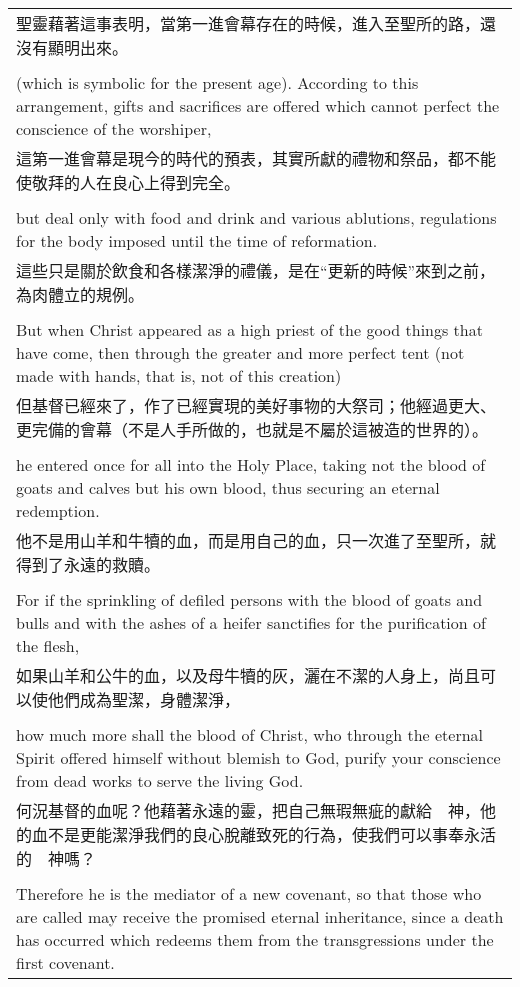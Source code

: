 \documentclass{book}
\begin{document}
\begin{tabularx}{\textwidth}{p{}}
聖靈藉著這事表明，當第一進會幕存在的時候，進入至聖所的路，還沒有顯明出來。 \\ \\
(which is symbolic for the present age). According to this arrangement, gifts and sacrifices are offered which cannot perfect the conscience of the worshiper, \\
這第一進會幕是現今的時代的預表，其實所獻的禮物和祭品，都不能使敬拜的人在良心上得到完全。 \\ \\
but deal only with food and drink and various ablutions, regulations for the body imposed until the time of reformation. \\
這些只是關於飲食和各樣潔淨的禮儀，是在“更新的時候”來到之前，為肉體立的規例。 \\ \\
But when Christ appeared as a high priest of the good things that have come, then through the greater and more perfect tent (not made with hands, that is, not of this creation) \\
但基督已經來了，作了已經實現的美好事物的大祭司；他經過更大、更完備的會幕（不是人手所做的，也就是不屬於這被造的世界的）。 \\ \\
he entered once for all into the Holy Place, taking not the blood of goats and calves but his own blood, thus securing an eternal redemption. \\
他不是用山羊和牛犢的血，而是用自己的血，只一次進了至聖所，就得到了永遠的救贖。 \\ \\
For if the sprinkling of defiled persons with the blood of goats and bulls and with the ashes of a heifer sanctifies for the purification of the flesh, \\
如果山羊和公牛的血，以及母牛犢的灰，灑在不潔的人身上，尚且可以使他們成為聖潔，身體潔淨， \\ \\
how much more shall the blood of Christ, who through the eternal Spirit offered himself without blemish to God, purify your conscience from dead works to serve the living God. \\
何況基督的血呢？他藉著永遠的靈，把自己無瑕無疵的獻給　神，他的血不是更能潔淨我們的良心脫離致死的行為，使我們可以事奉永活的　神嗎？ \\ \\
Therefore he is the mediator of a new covenant, so that those who are called may receive the promised eternal inheritance, since a death has occurred which redeems them from the transgressions under the first covenant. \\

\end{tabularx}
\end{document}
